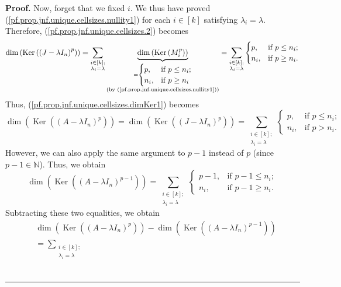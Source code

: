 \documentclass[numbers=enddot,12pt,final,onecolumn,notitlepage]{scrartcl}%
\numberwithin{exer}{subsection}
\theoremstyle{definition}
\newenvironment{proof}[1][Proof]{\noindent\textbf{#1.} }{\ \rule{0.5em}{0.5em}}
\let\sumnonlimits\sum
\renewcommand{\sum}{\sumnonlimits\limits}
\begin{document}
\begin{proof}
Now, forget that we fixed $i$. We thus have proved
(\ref{pf.prop.jnf.unique.cellsizes.nullity1}) for each $i\in\left[  k\right]
$ satisfying $\lambda_{i}=\lambda$. Therefore,
(\ref{pf.prop.jnf.unique.cellsizes.2}) becomes%
\[
\dim\left(  \operatorname*{Ker}\left(  \left(  J-\lambda I_{n}\right)
^{p}\right)  \right)  =\sum_{\substack{i\in\left[  k\right]  ;\\\lambda
_{i}=\lambda}}\underbrace{\dim\left(  \operatorname*{Ker}\left(  M_{i}%
^{p}\right)  \right)  }_{\substack{=%
\begin{cases}
p, & \text{if }p\leq n_{i};\\
n_{i}, & \text{if }p\geq n_{i}%
\end{cases}
\\\text{(by (\ref{pf.prop.jnf.unique.cellsizes.nullity1}))}}}=\sum
_{\substack{i\in\left[  k\right]  ;\\\lambda_{i}=\lambda}}%
\begin{cases}
p, & \text{if }p\leq n_{i};\\
n_{i}, & \text{if }p\geq n_{i}.
\end{cases}
\]
Thus, (\ref{pf.prop.jnf.unique.cellsizes.dimKer1}) becomes%
\[
\dim\left(  \operatorname*{Ker}\left(  \left(  A-\lambda I_{n}\right)
^{p}\right)  \right)  =\dim\left(  \operatorname*{Ker}\left(  \left(
J-\lambda I_{n}\right)  ^{p}\right)  \right)  =\sum_{\substack{i\in\left[
k\right]  ;\\\lambda_{i}=\lambda}}%
\begin{cases}
p, & \text{if }p\leq n_{i};\\
n_{i}, & \text{if }p>n_{i}.
\end{cases}
\]
However, we can also apply the same argument to $p-1$ instead of $p$ (since
$p-1\in\mathbb{N}$). Thus, we obtain%
\[
\dim\left(  \operatorname*{Ker}\left(  \left(  A-\lambda I_{n}\right)
^{p-1}\right)  \right)  =\sum_{\substack{i\in\left[  k\right]  ;\\\lambda
_{i}=\lambda}}%
\begin{cases}
p-1, & \text{if }p-1\leq n_{i};\\
n_{i}, & \text{if }p-1\geq n_{i}.
\end{cases}
\]
Subtracting these two equalities, we obtain%
\begin{align*}
&  \dim\left(  \operatorname*{Ker}\left(  \left(  A-\lambda I_{n}\right)
^{p}\right)  \right)  -\dim\left(  \operatorname*{Ker}\left(  \left(
A-\lambda I_{n}\right)  ^{p-1}\right)  \right) \\
&  =\sum_{\substack{i\in\left[  k\right]  ;\\\lambda_{i}=\lambda}}%

\end{align*}
\end{proof}
\end{document}
